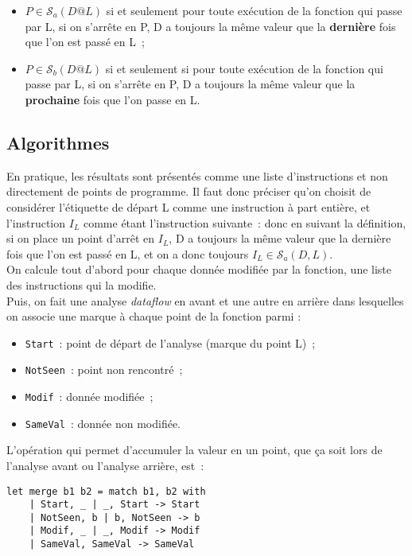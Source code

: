 \documentclass[a4paper,twoside]{article}
\newcommand{\sca}{\mathcal{S}_a}
\newcommand{\scb}{\mathcal{S}_b}
\begin{document}
\begin{itemize}
  \item $P \in \sca(D@L)$ si et seulement pour toute exécution de la fonction
    qui passe par L, si on s'arrête en P,
    D a toujours la même valeur
    que la {\bf dernière} fois que l'on est passé en L~;
  \item $P \in \scb(D@L)$ si et seulement si pour toute exécution
    de la fonction qui passe par L, si on s'arrête en P,
    D a toujours la même valeur que
    la {\bf prochaine} fois que l'on passe en L.
\end{itemize}

\subsection{Algorithmes}

En pratique, les résultats sont présentés comme une liste d'instructions et non
directement de points de programme. Il faut donc préciser
qu'on choisit de considérer l'étiquette de départ L comme une instruction
à part entière, et l'instruction $I_L$ comme étant l'instruction suivante~:
donc en suivant la définition, si on place un point d'arrêt en $I_L$,
D a toujours la même valeur que la dernière fois que l'on est passé en L,
et on a donc toujours $I_L \in \sca(D,L)$.\\

On calcule tout d'abord pour chaque donnée modifiée par la fonction,
une liste des instructions qui la modifie.\\

Puis, on fait une analyse {\it dataflow} en avant et une autre en arrière
dans lesquelles on associe une marque à chaque point de la fonction parmi :

\begin{itemize}
  \item {\tt Start}~: point de départ de l'analyse (marque du point L)~;
  \item {\tt NotSeen}~: point non rencontré~;
  \item {\tt Modif}~: donnée modifiée~;
  \item {\tt SameVal}~: donnée non modifiée.\\
\end{itemize}

L'opération qui permet d'accumuler la valeur en un point, que ça soit lors de
l'analyse avant ou l'analyse arrière, est~:
\begin{verbatim}
let merge b1 b2 = match b1, b2 with
    | Start, _ | _, Start -> Start
    | NotSeen, b | b, NotSeen -> b
    | Modif, _ | _, Modif -> Modif
    | SameVal, SameVal -> SameVal
\end{verbatim}
\end{document}
